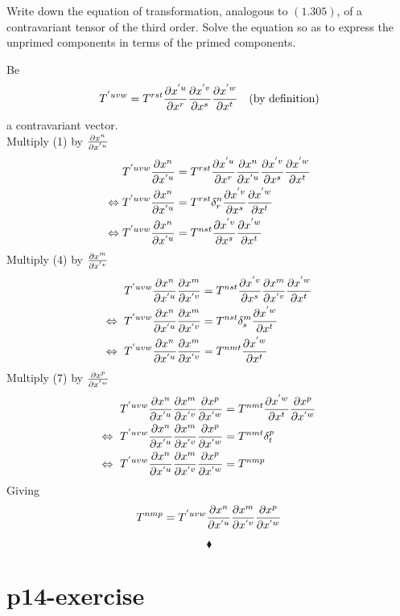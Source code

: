 \begin{tcolorbox}
Write down the equation of transformation, analogous to $\mathbf{(1.305)}$, of a contravariant tensor of the third order. Solve the equation so as to express the unprimed components in terms of the primed components.

\end{tcolorbox}
Be 
\begin{align}
T^{'uvw}=T^{rst} \pdv{x^{'u}}{x^r}\pdv{x^{'v}}{x^s}\pdv{x^{'w}}{x^t}\quad\text{(by definition)}
\end{align}
a contravariant vector.\\
Multiply (1) by $\pdv{x^{n}}{x^{'u}}$
\begin{align}
\ T^{'uvw}\pdv{x^{n}}{x^{'u}}&= T^{rst} \pdv{x^{'u}}{x^r}\pdv{x^{n}}{x^{'u}}\pdv{x^{'v}}{x^s}\pdv{x^{'w}}{x^t}\\
\Leftrightarrow  T^{'uvw}\pdv{x^{n}}{x^{'u}}&= T^{rst} \delta^{n}_{r}\pdv{x^{'v}}{x^s}\pdv{x^{'w}}{x^t}\\
\Leftrightarrow  T^{'uvw}\pdv{x^{n}}{x^{'u}}&= T^{nst} \pdv{x^{'v}}{x^s}\pdv{x^{'w}}{x^t}
\end{align}
Multiply (4) by $\pdv{x^{m}}{x^{'v}}$
\begin{align}
\ T^{'uvw}\pdv{x^{n}}{x^{'u}}\pdv{x^{m}}{x^{'v}} &= T^{nst} \pdv{x^{'v}}{x^s}\pdv{x^{m}}{x^{'v}}\pdv{x^{'w}}{x^t}\\
\Leftrightarrow  \ T^{'uvw}\pdv{x^{n}}{x^{'u}}\pdv{x^{m}}{x^{'v}} &= T^{nst} \delta_{s}^{m}\pdv{x^{'w}}{x^t}\\
\Leftrightarrow  \ T^{'uvw}\pdv{x^{n}}{x^{'u}}\pdv{x^{m}}{x^{'v}} &= T^{nmt} \pdv{x^{'w}}{x^t}
\end{align}
Multiply (7) by $\pdv{x^{p}}{x^{'w}}$
\begin{align}
\ T^{'uvw}\pdv{x^{n}}{x^{'u}}\pdv{x^{m}}{x^{'v}}\pdv{x^{p}}{x^{'w}} &= T^{nmt} \pdv{x^{'w}}{x^t}\pdv{x^{p}}{x^{'w}}\\
\Leftrightarrow \ T^{'uvw}\pdv{x^{n}}{x^{'u}}\pdv{x^{m}}{x^{'v}}\pdv{x^{p}}{x^{'w}} &= T^{nmt} \delta^{p}_{t}\\
\Leftrightarrow  \ T^{'uvw}\pdv{x^{n}}{x^{'u}}\pdv{x^{m}}{x^{'v}}\pdv{x^{p}}{x^{'w}} &= T^{nmp} 
\end{align}
Giving
$$T^{nmp} =  T^{'uvw}\pdv{x^{n}}{x^{'u}}\pdv{x^{m}}{x^{'v}}\pdv{x^{p}}{x^{'w}} $$

$$\blacklozenge$$
\pagebreak[4]

\section{p14-exercise}

